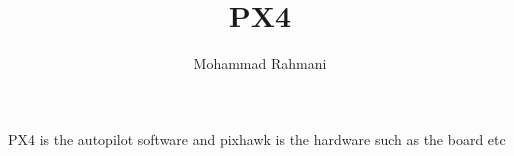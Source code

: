 \documentclass[a4paper]{article}
\title{PX4}
\date{}
\author{Mohammad Rahmani}
\begin{document}
   \maketitle
     PX4 is the autopilot software and pixhawk is the hardware such as the board etc

   
   
\end{document}
